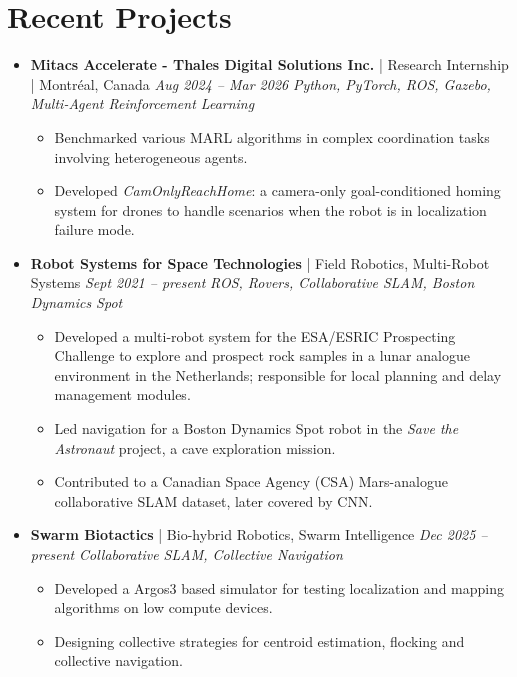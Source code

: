 \documentclass[letterpaper,10pt]{article}
\newenvironment{cvitemize}{
    \begin{itemize}[leftmargin=10pt,label={},afterlabel={},after=\vspace{-12pt}]
}{
    \end{itemize}
}
\begin{document}
\section*{Recent Projects}
\begin{cvitemize}

    \item{
        \textbf{Mitacs Accelerate - Thales Digital Solutions Inc.} | Research Internship | Montréal, Canada \hfill \enspace \textit{Aug 2024 -- Mar 2026}
        \newline
        \textit{Python, PyTorch, ROS, Gazebo, Multi-Agent Reinforcement Learning}
        \begin{itemize}
        \item Benchmarked various MARL algorithms in complex coordination tasks involving heterogeneous agents.
        \item Developed \textit{CamOnlyReachHome}: a camera-only goal-conditioned homing system for drones to handle scenarios when the robot is in localization failure mode.
        \end{itemize}
    }


    \item{
        \textbf{Robot Systems for Space Technologies} | Field Robotics, Multi-Robot Systems \hfill \enspace \textit{Sept 2021 -- present}
        \newline
        \textit{ROS, Rovers, Collaborative SLAM, Boston Dynamics Spot}
        \begin{itemize}
        \item Developed a multi-robot system for the ESA/ESRIC Prospecting Challenge to explore and prospect rock samples in a lunar analogue environment in the Netherlands; responsible for local planning and delay management modules.
        \item Led navigation for a Boston Dynamics Spot robot in the \textit{Save the Astronaut} project, a cave exploration mission.
        \item Contributed to a Canadian Space Agency (CSA) Mars-analogue collaborative SLAM dataset, later covered by CNN.
        \end{itemize}
    }


    \item{
        \textbf{Swarm Biotactics} | Bio-hybrid Robotics, Swarm Intelligence \hfill \enspace \textit{Dec 2025 -- present}
        \newline
        \textit{Collaborative SLAM, Collective Navigation}
        \begin{itemize}
        \item Developed a Argos3 based simulator for testing localization and mapping algorithms on low compute devices.
        \item Designing collective strategies for centroid estimation, flocking and collective navigation.
        \end{itemize}
    }

\end{cvitemize}
\end{document}
